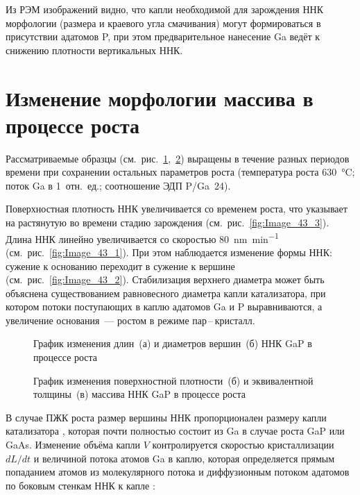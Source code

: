 Из РЭМ изображений видно, что капли необходимой для зарождения ННК морфологии
(размера и краевого угла смачивания) могут формироваться в присутствии адатомов
P, при этом предварительное нанесение Ga ведёт к снижению плотности
вертикальных ННК.

\section{Изменение морфологии массива в процессе
роста}\label{sec:ch5/sec3}

Рассматриваемые образцы
(см.~рис.~\cref{fig:Image_43_12},~\cref{fig:Image_43_34}) выращены в течение
разных периодов времени при сохранении остальных параметров роста (температура
роста 630~\si{\degreeCelsius}; поток Ga в 1~отн.~ед.; соотношение ЭДП P/Ga~24).

Поверхностная плотность ННК увеличивается со временем роста, что указывает на растянутую во времени стадию
зарождения (см.~рис.~\cref{fig:Image_43_3}).
Длина ННК линейно увеличивается со скоростью
80~\si{\nano\meter\per\minute} (см.~рис.~\cref{fig:Image_43_1}). При этом
наблюдается изменение формы ННК: сужение к основанию переходит в сужение к
вершине (см.~рис.~\cref{fig:Image_43_2}). Стабилизация верхнего диаметра может
быть объяснена существованием равновесного диаметра капли катализатора, при
котором потоки поступающих в каплю адатомов Ga и P выравниваются, а увеличение
основания~--- ростом в режиме пар\,--\,кристалл.

\begin{figure}[ht]
\caption{График изменения длин~(а) и диаметров вершин~(б) ННК GaP в процессе роста}
\label{fig:Image_43_12}
\end{figure}

\begin{figure}[ht]
\caption{График изменения поверхностной плотности~(б) и эквивалентной толщины~(в) массива ННК
GaP в процессе роста}
\label{fig:Image_43_34}
\end{figure}

В случае ПЖК роста размер вершины ННК пропорционален размеру капли катализатора
\cite{glas2010vapor}, которая почти полностью состоит из Ga в случае роста GaP
или GaAs. Изменение объёма капли \(V\) контролируется скоростью кристаллизации
\(dL/dt\) и величиной потока атомов Ga в каплю, которая определяется прямым
попаданием атомов из молекулярного потока и диффузионным потоком адатомов по
боковым стенкам ННК к капле \cite{glas2010vapor}:

